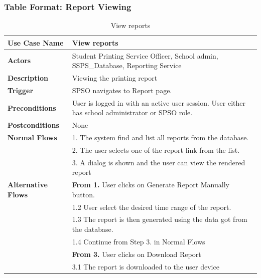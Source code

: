 \subsubsection{Table Format: Report Viewing}

\begin{table}[H]
\begin{tabular}{|p{5cm}|p{9cm}|}
\hline
\textbf{Use Case Name} & View reports \\
\hline
\textbf{Actors} & Student Printing Service Officer, School admin, SSPS\_Database, Reporting Service\\
\hline
\textbf{Description} & Viewing the printing report \\
\hline
\textbf{Trigger} &SPSO navigates to Report page. \\
\hline
\textbf{Preconditions} & User is logged in with an active user session. User either has school administrator or SPSO role. \\
\hline
\textbf{Postconditions} & None \\
\hline
\textbf{Normal Flows} &1. The system find and list all reports from the database.\\
&2. The user selects one of the report link from the list.\\
&3. A dialog is shown and the user can view the rendered report \\
\hline
\textbf{Alternative Flows} & \textbf{From 1.} User clicks on Generate Report Manually button.\\
&1.2 User select the desired time range of the report.\\
&1.3 The report is then generated using the data got from the database.\\
&1.4 Continue from Step 3. in Normal Flows \\
&  \textbf{From 3.} User clicks on Download Report \\
&  3.1 The report is downloaded to the user device \\
\hline

\end{tabular}
\caption{View reports}
\end{table}